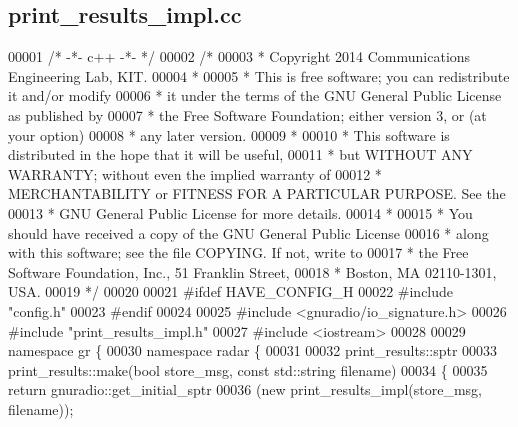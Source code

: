 \subsection{print\+\_\+results\+\_\+impl.\+cc}
\label{print__results__impl_8cc_source}

\begin{DoxyCode}
00001 \textcolor{comment}{/* -*- c++ -*- */}
00002 \textcolor{comment}{/* }
00003 \textcolor{comment}{ * Copyright 2014 Communications Engineering Lab, KIT.}
00004 \textcolor{comment}{ * }
00005 \textcolor{comment}{ * This is free software; you can redistribute it and/or modify}
00006 \textcolor{comment}{ * it under the terms of the GNU General Public License as published by}
00007 \textcolor{comment}{ * the Free Software Foundation; either version 3, or (at your option)}
00008 \textcolor{comment}{ * any later version.}
00009 \textcolor{comment}{ * }
00010 \textcolor{comment}{ * This software is distributed in the hope that it will be useful,}
00011 \textcolor{comment}{ * but WITHOUT ANY WARRANTY; without even the implied warranty of}
00012 \textcolor{comment}{ * MERCHANTABILITY or FITNESS FOR A PARTICULAR PURPOSE.  See the}
00013 \textcolor{comment}{ * GNU General Public License for more details.}
00014 \textcolor{comment}{ * }
00015 \textcolor{comment}{ * You should have received a copy of the GNU General Public License}
00016 \textcolor{comment}{ * along with this software; see the file COPYING.  If not, write to}
00017 \textcolor{comment}{ * the Free Software Foundation, Inc., 51 Franklin Street,}
00018 \textcolor{comment}{ * Boston, MA 02110-1301, USA.}
00019 \textcolor{comment}{ */}
00020  
00021 \textcolor{preprocessor}{#ifdef HAVE\_CONFIG\_H}
00022 \textcolor{preprocessor}{#include "config.h"}
00023 \textcolor{preprocessor}{#endif}
00024 
00025 \textcolor{preprocessor}{#include <gnuradio/io\_signature.h>}
00026 \textcolor{preprocessor}{#include "print_results_impl.h"}
00027 \textcolor{preprocessor}{#include <iostream>}
00028 
00029 \textcolor{keyword}{namespace }gr \{
00030   \textcolor{keyword}{namespace }radar \{
00031 
00032     print_results::sptr
00033     print_results::make(\textcolor{keywordtype}{bool} store\_msg, \textcolor{keyword}{const} std::string filename)
00034     \{
00035       \textcolor{keywordflow}{return} gnuradio::get\_initial\_sptr
00036         (\textcolor{keyword}{new} print_results_impl(store\_msg, filename));

\end{DoxyCode}
